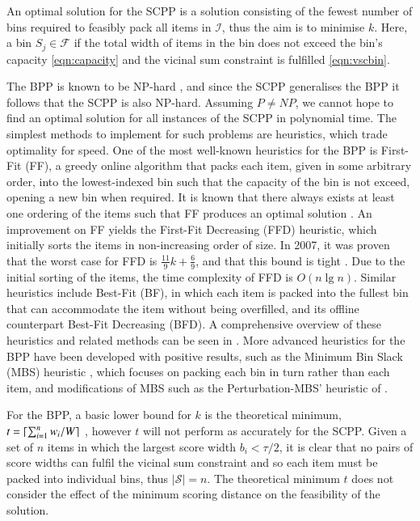 \documentclass[authoryear]{elsarticle}
\begin{document}
\noindent An optimal solution for the SCPP is a solution consisting of the fewest number of bins required to feasibly pack all items in $\mathcal{I}$, thus the aim is to minimise $k$. Here, a bin $S_j \in \mathcal{F}$ if the total width of items in the bin does not exceed the bin's capacity \eqref{eqn:capacity} and the vicinal sum constraint is fulfilled \eqref{eqn:vscbin}.

The BPP is known to be NP-hard \citep{garey1979}, and since the SCPP generalises the BPP it follows that the SCPP is also NP-hard. Assuming $P \neq NP$, we cannot hope to find an optimal solution for all instances of the SCPP in polynomial time. The simplest methods to implement for such problems are heuristics, which trade optimality for speed. One of the most well-known heuristics for the BPP is First-Fit (FF), a greedy online algorithm that packs each item, given in some arbitrary order, into the lowest-indexed bin such that the capacity of the bin is not exceed, opening a new bin when required. It is known that there always exists at least one ordering of the items such that FF produces an optimal solution \citep{lewis2009}. An improvement on FF yields the First-Fit Decreasing (FFD) heuristic, which initially sorts the items in non-increasing order of size. In 2007, it was proven that the worst case for FFD is $\frac{11}{9}k + \frac{6}{9}$, and that this bound is tight \citep{dosa2007}. Due to the initial sorting of the items, the time complexity of FFD is $O(n \lg n)$. Similar heuristics include Best-Fit (BF), in which each item is packed into the fullest bin that can accommodate the item without being overfilled, and its offline counterpart Best-Fit Decreasing (BFD). A comprehensive overview of these heuristics and related methods can be seen in \citet{coffman1984}. More advanced heuristics for the BPP have been developed with positive results, such as the Minimum Bin Slack (MBS) heuristic \citep{gupta1999}, which focuses on packing each bin in turn rather than each item, and modifications of MBS such as the Perturbation-MBS' heuristic of \citet{fleszar2002}. 

For the BPP, a basic lower bound for $k$ is the theoretical minimum, $t = \lceil\sum_{i=1}^{n} w_i / W\rceil$ \citep{martello1990l}, however $t$ will not perform as accurately for the SCPP. Given a set of $n$ items in which the largest score width $b_i < \tau / 2$, it is clear that no pairs of score widths can fulfil the vicinal sum constraint and so each item must be packed into individual bins, thus $|\mathcal{S}| = n$. The theoretical minimum $t$ does not consider the effect of the minimum scoring distance on the feasibility of the solution.
\end{document}

